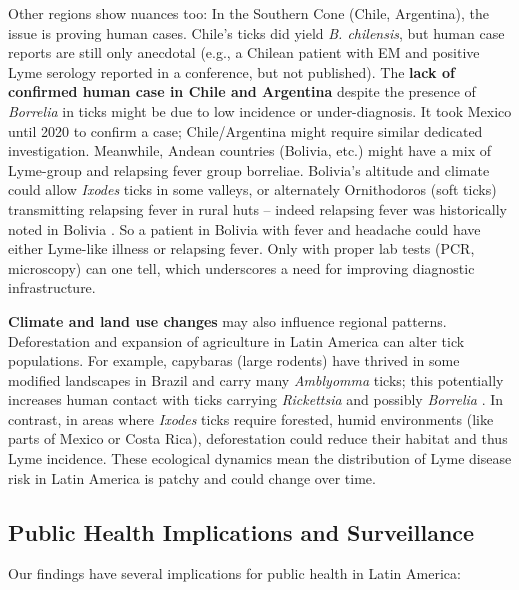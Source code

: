 \documentclass[11pt,letterpaper]{article}
\begin{document}
Other regions show nuances too: In the Southern Cone (Chile, Argentina), the issue is proving human cases. Chile's ticks did yield \textit{B. chilensis}, but human case reports are still only anecdotal (e.g., a Chilean patient with EM and positive Lyme serology reported in a conference, but not published). The \textbf{lack of confirmed human case in Chile and Argentina} despite the presence of \textit{Borrelia} in ticks might be due to low incidence or under-diagnosis. It took Mexico until 2020 to confirm a case; Chile/Argentina might require similar dedicated investigation. Meanwhile, Andean countries (Bolivia, etc.) might have a mix of Lyme-group and relapsing fever group borreliae. Bolivia's altitude and climate could allow \textit{Ixodes} ticks in some valleys, or alternately Ornithodoros (soft ticks) transmitting relapsing fever in rural huts – indeed relapsing fever was historically noted in Bolivia \citep{Colunga-Salas2022c}. So a patient in Bolivia with fever and headache could have either Lyme-like illness or relapsing fever. Only with proper lab tests (PCR, microscopy) can one tell, which underscores a need for improving diagnostic infrastructure.

\textbf{Climate and land use changes} may also influence regional patterns. Deforestation and expansion of agriculture in Latin America can alter tick populations. For example, capybaras (large rodents) have thrived in some modified landscapes in Brazil and carry many \textit{Amblyomma} ticks; this potentially increases human contact with ticks carrying \textit{Rickettsia} and possibly \textit{Borrelia} \citep{Jorge2023c, Jorge2023d}. In contrast, in areas where \textit{Ixodes} ticks require forested, humid environments (like parts of Mexico or Costa Rica), deforestation could reduce their habitat and thus Lyme incidence. These ecological dynamics mean the distribution of Lyme disease risk in Latin America is patchy and could change over time.

\subsection{Public Health Implications and Surveillance}
Our findings have several implications for public health in Latin America:
\end{document}
